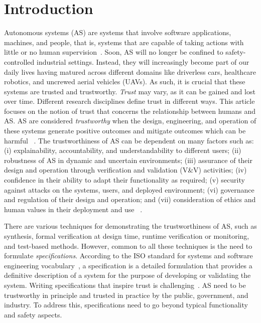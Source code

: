 \documentclass[sigconf,nonacm]{acmart}%
\begin{document}
	\section{Introduction}\label{introduction}
	Autonomous systems (AS) are systems that involve software applications, machines, and people, that is, systems that are capable of taking actions with little or no human supervision~\cite{Murukannaiah2020}. %
	Soon, AS will no longer be confined to safety-controlled industrial settings. Instead, they will increasingly become part of our daily lives having matured across different domains like driverless cars, healthcare robotics, and uncrewed aerial vehicles (UAVs). As such, it is crucial that these systems are trusted and trustworthy. \emph{Trust} may vary, as it can be gained and lost over time. Different research disciplines define trust in different ways. This article focuses on the notion of trust that concerns the relationship between humans and AS. AS are considered \emph{trustworthy} when the design, engineering, and operation of these systems generate positive outcomes and mitigate outcomes which can be harmful ~\cite{Naiseh2022}.
	The trustworthiness of AS can be dependent on many factors such as: (i) explainability, accountability, and understandability to different users; (ii) robustness of AS in dynamic and uncertain environments; (iii) assurance of their design and operation through verification and validation (V\&V) activities; (iv) confidence in their ability to adapt their functionality as required; (v) security against attacks on the systems, users, and deployed environment; (vi) governance and regulation of their design and operation; and (vii) consideration of ethics and human values in their deployment and use ~\cite{Naiseh2022}. 
	
	There are various techniques for demonstrating the trustworthiness of AS, such as synthesis, formal verification at design time, runtime verification or monitoring, and test-based methods. However, common to all these techniques is the need to formulate \emph{specifications}. According to the ISO standard for systems and software engineering vocabulary~\cite{ISO24765:2017}, a specification is a detailed formulation that provides a definitive description of a system for the purpose of developing or validating the system. Writing specifications that inspire trust is challenging~\cite{Kress-Gazit2021}. %
 AS need to be trustworthy in principle and trusted in practice by the public, government, and industry. 
	To address this, specifications need to go beyond typical functionality and safety aspects. 	
		
\end{document}
